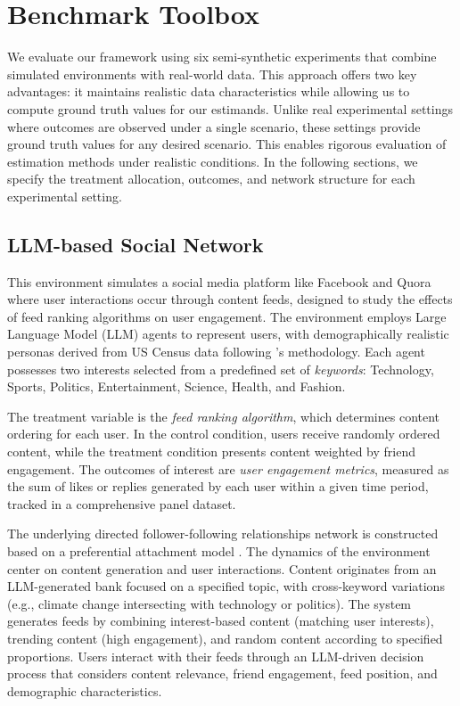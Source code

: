 \section{Benchmark Toolbox}
\label{sec:Benchmark_Toolbox}
% 
We evaluate our framework using six semi-synthetic experiments that combine simulated environments with real-world data. This approach offers two key advantages: it maintains realistic data characteristics while allowing us to compute ground truth values for our estimands. Unlike real experimental settings where outcomes are observed under a single scenario, these settings provide ground truth values for any desired scenario. This enables rigorous evaluation of estimation methods under realistic conditions. In the following sections, we specify the treatment allocation, outcomes, and network structure for each experimental setting.


\subsection{LLM-based Social Network}
\label{sec:LLM}
% 
This environment simulates a social media platform like Facebook and Quora where user interactions occur through content feeds, designed to study the effects of feed ranking algorithms on user engagement. The environment employs Large Language Model (LLM) agents to represent users, with demographically realistic personas derived from US Census data \citep{uscensus2023} following \cite{chang2024llms}'s methodology. Each agent possesses two interests selected from a predefined set of \emph{keywords}: Technology, Sports, Politics, Entertainment, Science, Health, and Fashion.

The treatment variable is the \emph{feed ranking algorithm}, which determines content ordering for each user. In the control condition, users receive randomly ordered content, while the treatment condition presents content weighted by friend engagement. The outcomes of interest are \emph{user engagement metrics}, measured as the sum of likes or replies generated by each user within a given time period, tracked in a comprehensive panel dataset.

The underlying directed follower-following relationships network is constructed based on a preferential attachment model \citep{barabasi1999emergence}. The dynamics of the environment center on content generation and user interactions. Content originates from an LLM-generated bank focused on a specified topic, with cross-keyword variations (e.g., climate change intersecting with technology or politics). The system generates feeds by combining interest-based content (matching user interests), trending content (high engagement), and random content according to specified proportions. Users interact with their feeds through an LLM-driven decision process that considers content relevance, friend engagement, feed position, and demographic characteristics.


